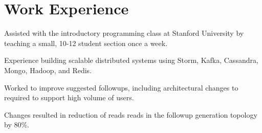\documentclass[letterpaper]{deedy-resume} %
\begin{document}
%
\begin{minipage}[t]{0.66\textwidth} %


\section{Work Experience}


\vspace{\topsep} %
\begin{tightitemize}
\item Assisted with the introductory programming class at Stanford University by teaching a small, 10-12 student section once a week.
\end{tightitemize}

\sectionspace %



\begin{tightitemize}
\item Experience building scalable distributed systems using Storm, Kafka, Cassandra, Mongo, Hadoop, and Redis.

\item Worked to improve suggested followups, including architectural changes to required to support high volume of users.

\item Changes resulted in reduction of reads reads in the followup generation topology by 80\%.

\end{tightitemize}

\sectionspace %



\end{minipage}
\end{document}
